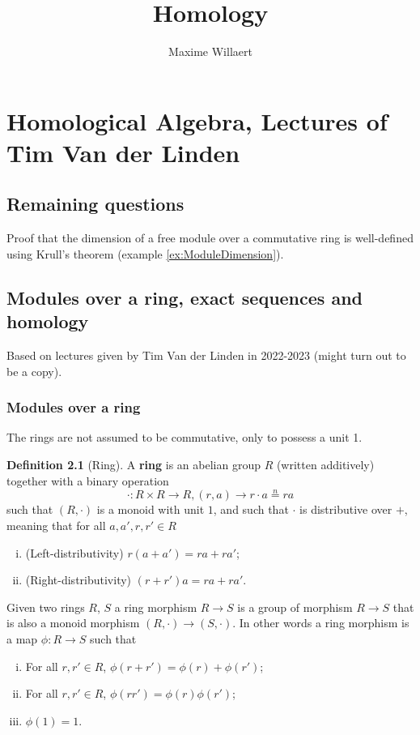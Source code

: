 \documentclass[a4paper,12pt,parskip=half*,chapterprefix=true,numbers=noendperiod]{scrreprt}
\title{Homology}
\author{Maxime Willaert}
\theoremstyle{definition}
\newtheorem{definition}{Definition}[section]
\theoremstyle{remark}
\begin{document}
\maketitle

\tableofcontents

\part{Homological Algebra, Lectures of Tim Van der Linden \cite{vanderLinden:Homology}}

\chapter{Remaining questions}

Proof that the dimension of a free module over a commutative ring is well-defined using Krull's theorem (example \ref{ex:ModuleDimension}).

\chapter{Modules over a ring, exact sequences and homology}

Based on lectures given by Tim Van der Linden in 2022-2023 \cite{vanderLinden:Homology} (might turn out to be a copy).

\section{Modules over a ring}

The rings are not assumed to be commutative, only to possess a unit 1.
\begin{definition}[Ring]
	A \textbf{ring} is an abelian group $R$ (written additively) together with a binary operation
	\begin{equation*}
		\cdot:R\times R\to R,(r,a)\to r\cdot a\overset{n}{=} ra
	\end{equation*}
	such that $(R,\cdot)$ is a monoid with unit $1$, and such that $\cdot$ is distributive over $+$, meaning that for all $a,a',r,r'\in R$
	\begin{enumerate}[(i)]
		\item (Left-distributivity) $r(a+a')=ra+ra'$;
		\item (Right-distributivity) $(r+r')a=ra+ra'$.
	\end{enumerate}
	
	Given two rings $R$, $S$ a ring morphism $R\to S$ is a group of morphism $R\to S$ that is also a monoid morphism $(R,\cdot)\to (S,\cdot)$. In other words a ring morphism is a map $\phi:R\to S$ such that
	\begin{enumerate}[(i)]
		\item For all $r,r'\in R$, $\phi(r+r')=\phi(r)+\phi(r')$;
		\item For all $r,r'\in R$, $\phi(rr')=\phi(r)\phi(r')$;
		\item $\phi(1)=1$.
	\end{enumerate}
\end{definition}
\end{document}

